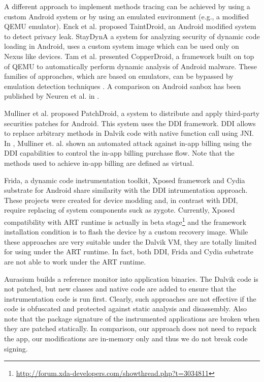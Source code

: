 A different approach to implement methods tracing can be achieved by using a custom Android system or by using an emulated environment (e.g., a modified QEMU emulator). Enck et al. proposed TaintDroid\cite{enck2014taintdroid}, an Android modified system to detect privacy leak. StayDynA\cite{zhauniarovich2015stadyna} a system for analyzing security of dynamic code loading in Android, uses a custom system image  which can be used only on Nexus like devices. Tam et al. presented CopperDroid\cite{tam2015copperdroid}, a framework built on top of QEMU to automatically perform dynamic analysis of Android malware. These families of approaches, which are based on emulators, can be bypassed by emulation detection techniques \cite{petsas2014rage} \cite{vidas2014evading}. A comparison on Android sanbox has been published by Neuren et al. in \cite{neuner2014enter}. 

Mulliner et al. proposed PatchDroid\cite{mulliner2013patchdroid}, a system to distribute and apply third-party securities patches for Android. This system uses the DDI\cite{DDI} framework. DDI allows to replace arbitrary methods in Dalvik code with native function call using JNI. In \cite{mulliner2014virtualswindle}, Mulliner et. al. shown an automated attack against in-app billing using the DDI capabilities to control the in-app billing purchase flow. Note that the methods used to achieve in-app billing are defined as virtual.

Frida\cite{Frida}, a dynamic code instrumentation toolkit, Xposed framework  \cite{Xposed} and Cydia substrate for Android \cite{Cydia} share similarity with the DDI intrumentation approach. These projects were created for device modding and, in contrast with DDI, require replacing of system components suck as zygote. Currently, Xposed compatibility with ART runtime is actually in beta stage\footnote{\url{http://forum.xda-developers.com/showthread.php?t=3034811}} and the framework installation condition is to flash the device by a custom recovery image.
While these approaches are very suitable under the Dalvik VM, they are totally limited for using under the ART runtime. In fact, both DDI, Frida and Cydia substrate are not able to work under the ART runtime. 

Aurasium \cite{xu2012aurasium} builds a reference monitor into application binaries. The Dalvik code is not patched, but new classes and native code are added to ensure that the instrumentation code is run first. Clearly, such approaches are not effective if the code is obfuscated and protected against static analysis and disassembly. Also note that the package signature of the instrumented applications are broken when they are patched statically. In comparison, our approach does not need to repack the app, our modifications are in-memory only and thus we do not break code signing.

